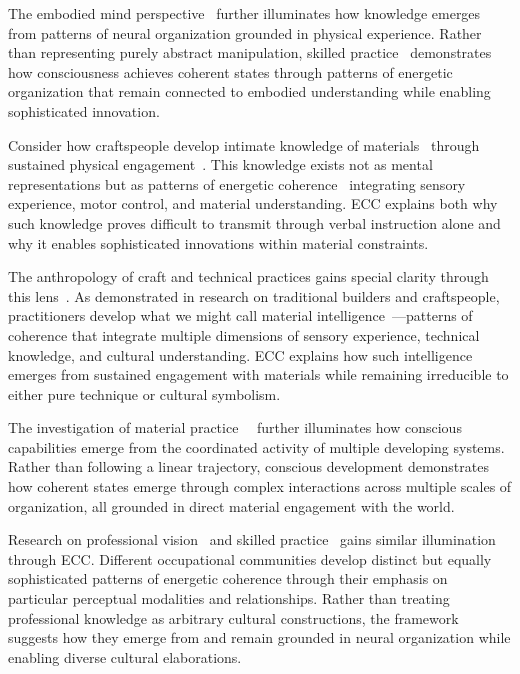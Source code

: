 The embodied mind perspective~\cite{csordas1994embodiment,ingold2011being} further illuminates how knowledge emerges from patterns of neural organization grounded in physical experience. Rather than representing purely abstract manipulation, skilled practice~ demonstrates how consciousness achieves coherent states through patterns of energetic organization that remain connected to embodied understanding while enabling sophisticated innovation.

Consider how craftspeople develop intimate knowledge of materials~ through sustained physical engagement~\cite{bunn1999nomads,marchand2010making}. This knowledge exists not as mental representations but as patterns of energetic coherence~ integrating sensory experience, motor control, and material understanding. ECC explains both why such knowledge proves difficult to transmit through verbal instruction alone and why it enables sophisticated innovations within material constraints.

The anthropology of craft and technical practices gains special clarity through this lens~\cite{bunn1999nomads,myers2015rendering}. As demonstrated in research on traditional builders and craftspeople, practitioners develop what we might call material intelligence~—patterns of coherence that integrate multiple dimensions of sensory experience, technical knowledge, and cultural understanding. ECC explains how such intelligence emerges from sustained engagement with materials while remaining irreducible to either pure technique or cultural symbolism.

The investigation of material practice~~\cite{warnier2001praxeological,miller2005materiality} further illuminates how conscious capabilities emerge from the coordinated activity of multiple developing systems. Rather than following a linear trajectory, conscious development demonstrates how coherent states emerge through complex interactions across multiple scales of organization, all grounded in direct material engagement with the world.

Research on professional vision~ and skilled practice~\cite{goodwin1994professional,ingold2013making} gains similar illumination through ECC. Different occupational communities develop distinct but equally sophisticated patterns of energetic coherence through their emphasis on particular perceptual modalities and relationships. Rather than treating professional knowledge as arbitrary cultural constructions, the framework suggests how they emerge from and remain grounded in neural organization while enabling diverse cultural elaborations.

